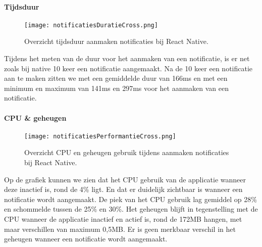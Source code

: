 \paragraph{Tijdsduur}
\begin{figure}[H]
  \centering
  \texttt{[image: notificatiesDuratieCross.png]}
  \caption{Overzicht tijdsduur aanmaken notificaties bij React Native.}
\end{figure}
Tijdens het meten van de duur voor het aanmaken van een notificatie, is er net zoals bij native 
10 keer een notificatie aangemaakt. Na de 10 keer een notificatie aan te maken zitten we met 
een gemiddelde duur van 166ms en met een minimum en 
maximum van 141ms en 297ms voor het aanmaken van een notificatie.

\paragraph{CPU \& geheugen}
\begin{figure}[H]
  \centering
  \texttt{[image: notificatiesPerformantieCross.png]}
  \caption{Overzicht CPU en geheugen gebruik tijdens aanmaken notificaties bij React Native.}
\end{figure}
Op de grafiek kunnen we zien dat het CPU gebruik van de applicatie wanneer deze inactief is, rond de 4\% ligt. 
En dat er duidelijk zichtbaar is wanneer een notificatie wordt aangemaakt. De piek van het CPU gebruik lag 
gemiddel op 28\% en schommelde tussen de 25\% en 30\%. Het geheugen blijft in tegenstelling met de CPU 
wanneer de applicatie inactief en actief is, rond de 172MB hangen, met maar verschillen van maximum 0,5MB. 
Er is geen merkbaar verschil in het geheugen wanneer een notificatie wordt aangemaakt.

